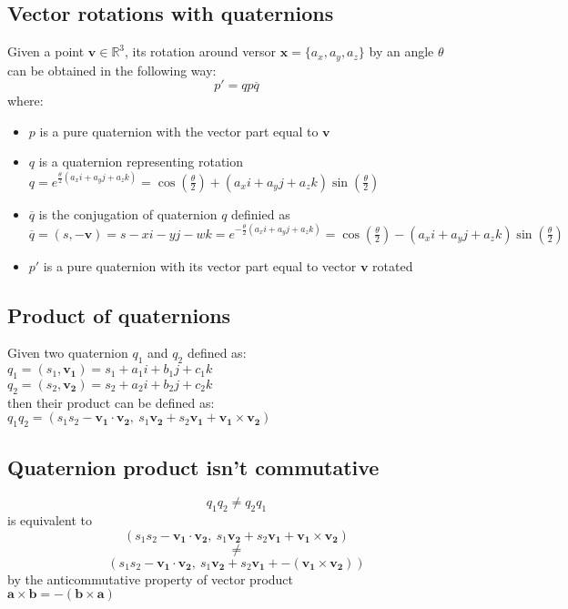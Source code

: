 \subsection{Vector rotations with quaternions}
Given a point $\boldsymbol{v} \in \mathbb{R}^3$, its rotation around versor $\boldsymbol{x}=\{a_x, a_y, a_z\}$ by an angle $\theta$ can be obtained in the following way:
$$ p' = q p \overline{q}$$
where: \\
\begin{itemize}
\item $p$ is a pure quaternion with the vector part equal to $\boldsymbol{v}$
\item $q$ is a quaternion representing rotation $q=e^{\frac{\theta}{2}\left(a_x i + a_y j + a_z k\right)}=\cos\left(\frac{\theta}{2}\right)+(a_x i + a_y j + a_z k)\sin\left(\frac{\theta}{2}\right)$ 
\item $\overline{q}$ is the conjugation of quaternion $q$ definied as \\
$\overline{q}=(s,-\boldsymbol{v})=s-xi-yj-wk=e^{-\frac{\theta}{2}\left(a_x i + a_y j + a_z k\right)}=\cos \left(\frac{\theta}{2}\right)-(a_x i + a_y j + a_z k)\sin \left(\frac{\theta}{2}\right)$
\item $p'$ is a pure quaternion with its vector part equal to vector $\boldsymbol{v}$ rotated
\end{itemize}

\subsection{Product of quaternions}
Given two quaternion $q_1$ and $q_2$ defined as: \\
$q_1 = (s_1,\boldsymbol{v_1})=s_1+a_1i+b_1j+c_1k$ \\
$q_2=(s_2,\boldsymbol{v_2})=s_2+a_2i+b_2j+c_2k$ \\
then their product can be defined as: \\
$q_1 q_2 = (s_1 s_2 - \boldsymbol{v_1 \cdot v_2}, \ s_1 \boldsymbol{v_2} + s_2 \boldsymbol{v_1} + \boldsymbol{v_1} \times \boldsymbol{v_2})$

\subsection{Quaternion product isn't commutative}
$$q_1 q_2 \neq q_2 q_1$$ 
\centering
is equivalent to
$$(s_1 s_2 - \boldsymbol{v_1 \cdot v_2}, \ s_1 \boldsymbol{v_2} + s_2 \boldsymbol{v_1} + \boldsymbol{v_1} \times \boldsymbol{v_2})$$
$$ \neq $$
$$(s_1 s_2 - \boldsymbol{v_1 \cdot v_2}, \ s_1 \boldsymbol{v_2} + s_2 \boldsymbol{v_1} + - (\boldsymbol{v_1} \times \boldsymbol{v_2}))$$ 
\justify
by the anticommutative property of vector product \cite{amslaurea6701} \\
$ \boldsymbol{a} \times \boldsymbol{b} = - (\boldsymbol{b} \times \boldsymbol{a}) $

